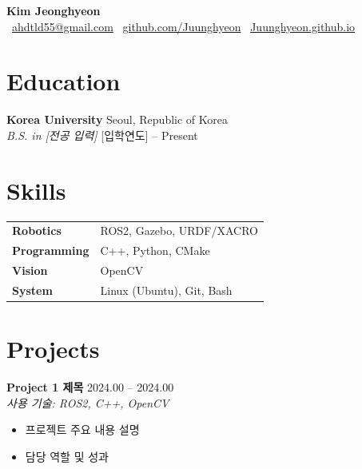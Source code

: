 \documentclass[11pt, a4paper]{article}
\begin{document}
\begin{center}
  {\LARGE\bfseries Kim Jeonghyeon} \\[4pt]
  {\color{accent}
    \faEnvelope\ \href{mailto:ahdtld55@gmail.com}{ahdtld55@gmail.com} \quad
    \faGithub\ \href{https://github.com/Juunghyeon}{github.com/Juunghyeon} \quad
    \faGlobe\ \href{https://Juunghyeon.github.io}{Juunghyeon.github.io}
  }
\end{center}

\vspace{4pt}

\section{Education}

\textbf{Korea University} \hfill Seoul, Republic of Korea \\
\textit{B.S. in [전공 입력]} \hfill [입학연도] -- Present

\section{Skills}

\begin{tabularx}{\linewidth}{@{} l X @{}}
  \textbf{Robotics}     & ROS2, Gazebo, URDF/XACRO \\
  \textbf{Programming}  & C++, Python, CMake \\
  \textbf{Vision}       & OpenCV \\
  \textbf{System}       & Linux (Ubuntu), Git, Bash \\
\end{tabularx}

\section{Projects}

\textbf{Project 1 제목} \hfill 2024.00 -- 2024.00 \\
\textit{사용 기술: ROS2, C++, OpenCV}
\begin{itemize}
  \item 프로젝트 주요 내용 설명
  \item 담당 역할 및 성과
\end{itemize}

\vspace{4pt}
\end{document}
